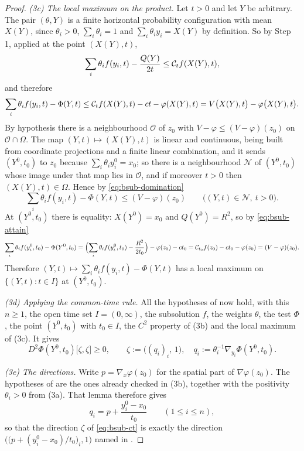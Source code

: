 \begin{proof}
\emph{(3c) The local maximum on the product.} Let $t>0$ and let $Y$ be
arbitrary. The pair $(\theta,Y)$ is a finite horizontal probability
configuration with mean $X(Y)$, since $\theta_i>0$, $\sum_i\theta_i=1$ and
$\sum_i\theta_iy_i=X(Y)$ by definition. So by Step 1, applied at the point
$(X(Y),t)$,
\[
  \sum_i\theta_if(y_i,t)-\frac{Q(Y)}{2t}\le\mathcal{C}_tf(X(Y),t),
\]
and therefore
\begin{equation}\label{eq:bsub-domination}
  \sum_i\theta_if(y_i,t)-\Phi(Y,t)
   \le\mathcal{C}_tf(X(Y),t)-ct-\varphi(X(Y),t)
   =V\bigl(X(Y),t\bigr)-\varphi\bigl(X(Y),t\bigr).
\end{equation}
By hypothesis there is a neighbourhood $\mathcal O$ of $z_0$ with
$V-\varphi\le(V-\varphi)(z_0)$ on $\mathcal O\cap\Omega$. The map
$(Y,t)\mapsto(X(Y),t)$ is linear and continuous, being built from coordinate
projections and a finite linear combination, and it sends $(Y^0,t_0)$ to $z_0$
because $\sum_i\theta_iy^0_i=x_0$; so there is a neighbourhood $\mathcal N$ of
$(Y^0,t_0)$ whose image under that map lies in $\mathcal O$, and if moreover
$t>0$ then $(X(Y),t)\in\Omega$. Hence by \eqref{eq:bsub-domination}
\[
  \sum_i\theta_if(y_i,t)-\Phi(Y,t)\le(V-\varphi)(z_0)
  \qquad\bigl((Y,t)\in\mathcal N,\ t>0\bigr).
\]
At $(Y^0,t_0)$ there is equality: $X(Y^0)=x_0$ and $Q(Y^0)=R^2$, so by
\eqref{eq:bsub-attain}
\[
  \sum_i\theta_if(y^0_i,t_0)-\Phi(Y^0,t_0)
   =\Bigl(\sum_i\theta_if(y^0_i,t_0)-\frac{R^2}{2t_0}\Bigr)
     -\varphi(z_0)-ct_0
   =\mathcal{C}_{t_0}f(z_0)-ct_0-\varphi(z_0)=(V-\varphi)(z_0).
\]
Therefore $(Y,t)\mapsto\sum_i\theta_if(y_i,t)-\Phi(Y,t)$ has a local maximum on
$\{(Y,t):t\in I\}$ at $(Y^0,t_0)$.

\emph{(3d) Applying the common-time rule.} All the hypotheses of
 now hold, with this $n\ge1$, the open time set
$I=(0,\infty)$, the subsolution $f$, the weights $\theta$, the test $\Phi$, the
point $(Y^0,t_0)$ with $t_0\in I$, the $C^2$ property of (3b) and the local
maximum of (3c). It gives
\begin{equation}\label{eq:bsub-ct}
  D^2\Phi(Y^0,t_0)\bigl[\zeta,\zeta\bigr]\ge0,
  \qquad \zeta:=\bigl((q_i)_i,\,1\bigr),\quad
  q_i:=\theta_i^{-1}\nabla_{y_i}\Phi(Y^0,t_0).
\end{equation}

\emph{(3e) The directions.} Write $p=\nabla_x\varphi(z_0)$ for the spatial part
of $\nabla\varphi(z_0)$. The hypotheses of  are the
ones already checked in (3b), together with the positivity $\theta_i>0$ from
(3a). That lemma therefore gives
\begin{equation}\label{eq:bsub-qi}
  q_i=p+\frac{y^0_i-x_0}{t_0}\qquad(1\le i\le n),
\end{equation}
so that the direction $\zeta$ of \eqref{eq:bsub-ct} is exactly the direction
$\bigl(\bigl(p+(y^0_i-x_0)/t_0\bigr)_i,1\bigr)$ named in
.


\end{proof}
